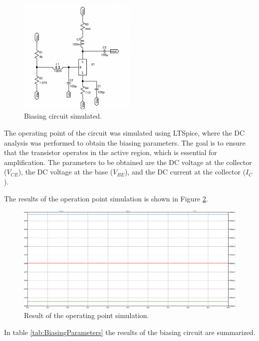 \begin{figure}[H]
    \centering
    \includegraphics[width=0.5\textwidth]{Images/SIMBiasCircuit.png}
    \caption{Biasing circuit simulated.}
    \label{fig:SIMBiasCircuit}
\end{figure}

The operating point of the circuit was simulated using LTSpice, where the DC analysis was performed to obtain the biasing parameters. The goal is to ensure that the transistor operates in the active region, which is essential for amplification. The parameters to be obtained are the DC voltage at the collector ($V_{CE}$), the DC voltage at the base ($V_{BE}$), and the DC current at the collector ($I_{C}$).

The results of the operation point simulation is shown in Figure \ref{fig:SIMBias}.

\begin{figure}[H]
    \centering
    \includegraphics[width=1\textwidth]{Images/SIMBias.png}
    \caption{Result of the operating point simulation.}
    \label{fig:SIMBias}
\end{figure}

In table \ref{tab:BiasingParameters} the results of the biasing circuit are summarized.

